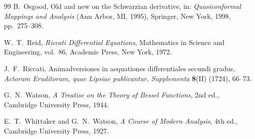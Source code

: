 \documentclass{amsart}
\theoremstyle{definition}
\theoremstyle{remark}
\begin{document}
\begin{thebibliography}{99}
B.~Osgood,
Old and new on the Schwarzian derivative,
in: \textit{Quasiconformal Mappings and Analysis} (Ann Arbor, MI, 1995),
Springer, New York, 1998, pp.~275--308.

W.~T.~Reid,
\textit{Riccati Differential Equations},
Mathematics in Science and Engineering, vol.~86,
Academic Press, New York, 1972.

J.~F.~Riccati,
Animadversiones in aequationes differentiales secundi gradus,
\textit{Actorum Eruditorum, quae Lipsiae publicantur, Supplementa} \textbf{8}(II) (1724), 66--73.

G.~N.~Watson,
\textit{A Treatise on the Theory of Bessel Functions},
2nd ed., Cambridge University Press, 1944.

E.~T.~Whittaker and G.~N.~Watson,
\textit{A Course of Modern Analysis},
4th ed., Cambridge University Press, 1927.

\end{thebibliography}
\end{document}

